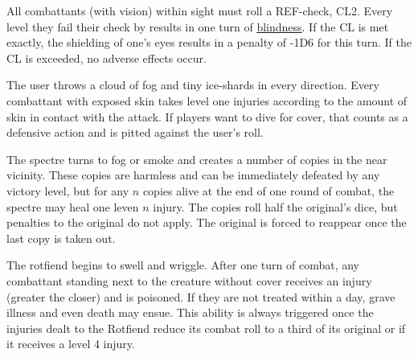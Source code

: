 {
    All combattants (with vision) within sight must roll a REF-check, CL2. Every level they fail their check by
    results in one turn of \hyperref[modifier:blindness]{blindness}. If the CL is met exactly, the shielding of one's eyes results in a penalty
    of -1D6 for this turn. If the CL is exceeded, no adverse effects occur.
}

{
    The user throws a cloud of fog and tiny ice-shards in every direction.
    Every combattant with exposed skin takes level one injuries according to
    the amount of skin in contact with the attack. If players want to dive for
    cover, that counts as a defensive action and is pitted against the user's roll.
}

{
    The spectre turns to fog or smoke and creates a number of copies in the near vicinity. These
    copies are harmless and can be immediately defeated by any victory level, but for any $n$ copies
    alive at the end of one round of combat, the spectre may heal one leven $n$ injury. The copies
    roll half the original's dice, but penalties to the original do not apply. The original is forced
    to reappear once the last copy is taken out.
}

{
    The rotfiend begins to swell and wriggle. After one turn of combat, any combattant standing next to
    the creature without cover receives an injury (greater the closer) and is poisoned. If they are not
    treated within a day, grave illness and even death may ensue. This ability is always triggered once
    the injuries dealt to the Rotfiend reduce its combat roll to a third of its original or if it receives
    a level 4 injury.
}